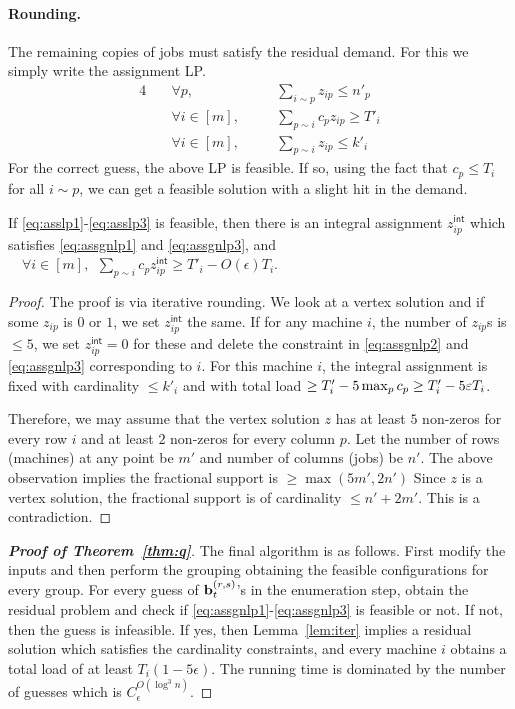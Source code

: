 \paragraph{Rounding.}
The remaining copies of jobs must satisfy the residual demand. For this we simply write the assignment LP.
\begin{alignat}{4}
	& \quad \forall p,   &&\quad  \textstyle \sum_{i\sim p} z_{ip} \leq n'_p \label{eq:assgnlp1} \\
	& \quad \forall i\in [m] ,  &&\quad  \textstyle \sum_{p\sim i} c_pz_{ip}  \geq T'_i \label{eq:assgnlp2}\\
	& \quad \forall i\in [m], && \quad \textstyle \sum_{p\sim i} z_{ip}  \leq  k'_i \label{eq:assgnlp3}
\end{alignat}
\def\zz{z^{\mathsf{int}}}
For the correct guess, the above LP is feasible. If so, using the fact that $c_p \leq T_i$ for all $i\sim p$, we can get a feasible solution with a slight hit in the demand.
\begin{lemma}\label{lem:iter}
If \eqref{eq:asslp1}-\eqref{eq:asslp3} is feasible, then there is an integral assignment $\zz_{ip}$ which satisfies \eqref{eq:assgnlp1} and \eqref{eq:assgnlp3}, and 
$\quad \forall i\in [m], ~~ \sum_{p\sim i} c_p\zz_{ip}  \geq T'_i - O(\epsilon)T_i$.
\end{lemma}
\begin{proof}
The proof is via iterative rounding. We look at a vertex solution and if some $z_{ip}$ is $0$ or $1$, we set $\zz_{ip}$ the same. 
If for any machine $i$, the number of $z_{ip}$s is $\leq 5$, we set $\zz_{ip} = 0$ for these and delete the constraint in \eqref{eq:assgnlp2} and \eqref{eq:assgnlp3} corresponding to $i$.
For this machine $i$, the integral assignment is fixed with cardinality $\le k'_i$ and with total load $\geq T'_i - 5\max_p c_p \geq T'_i - 5\varepsilon T_i$.

Therefore, we may assume that the vertex solution $z$ has at least $5$ non-zeros for every row $i$ and at least $2$ non-zeros for every column $p$.
Let the number of rows (machines) at any point be $m'$ and number of columns (jobs) be $n'$.  The above observation implies the fractional support is $\geq \max(5m',2n')$ 
Since $z$ is a vertex solution, the fractional support is of cardinality $\leq n' + 2m'$.
This is a contradiction.
\end{proof}
\begin{proof}[{\bf Proof of Theorem~\ref{thm:q}}]
The final algorithm is as follows.
First modify the inputs and then perform the grouping obtaining the feasible configurations for every group.
For every guess of $\mathbf{b}^{(r,s)}_t$'s in the enumeration step, obtain the residual problem and check if \eqref{eq:assgnlp1}-\eqref{eq:assgnlp3} is feasible or not. If not, then the guess is infeasible.
If yes, then Lemma~\ref{lem:iter} implies a residual solution which satisfies the cardinality constraints, and every machine $i$ obtains a total load of at least $T_i (1 - 5\epsilon)$. 
The running time is dominated by the number of guesses which is $C_\epsilon^{O(\log^3 n)}$.
\end{proof}



